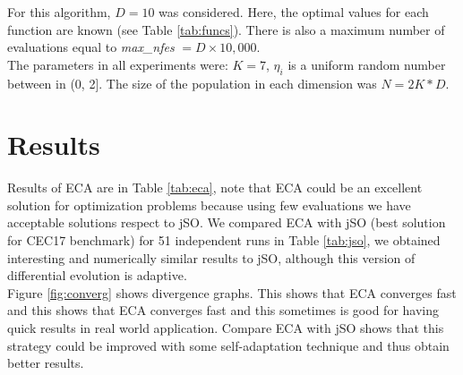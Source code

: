 \documentclass[graybox]{svmult}
\begin{document}
For this algorithm, $D = 10$ was considered. Here, the optimal values for each function are known (see Table \ref{tab:funcs}). There is also a maximum number of evaluations equal to \textit{max\_nfes} $= D \times 10,000$.\\

The parameters in all experiments were: $K = 7$, $\eta_i$ is a uniform random number between in (0, 2]. The size of the population in each dimension was $N = 2K * D $.







\section{Results} %
\label{sec:results}

Results of ECA are in Table \ref{tab:eca}, note that ECA could be an excellent solution for optimization problems because using few evaluations we have acceptable solutions respect to jSO. We compared ECA with jSO (best solution for CEC17 benchmark) for 51 independent runs in Table \ref{tab:jso}, we obtained interesting and numerically similar results to jSO, although this version of differential evolution is adaptive.\\

Figure \ref{fig:converg} shows divergence graphs. This shows that ECA converges fast and this shows that ECA converges fast and this sometimes is good for having quick results in real world application. Compare ECA with jSO shows that this strategy could be improved with some  self-adaptation technique and thus obtain better results.
\end{document}
